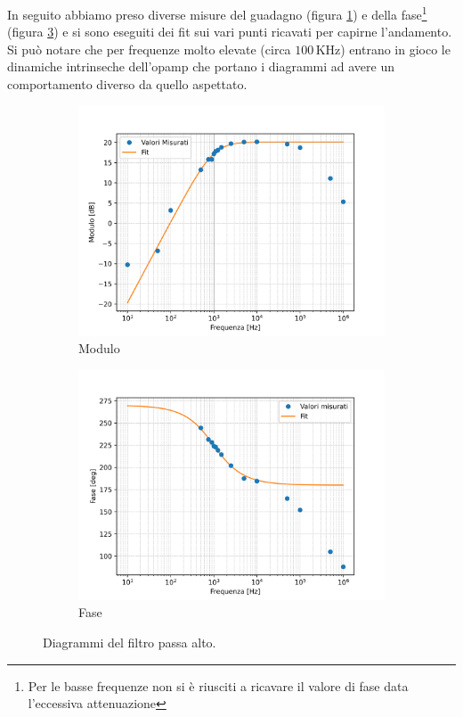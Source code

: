 \documentclass[a4paper,12pt]{article}
\begin{document}
In seguito abbiamo preso diverse misure del guadagno (figura \ref{fig:modulo_filtro_passa_alto}) e della fase\footnote{Per le basse frequenze non si è riusciti a ricavare il valore di fase data l'eccessiva attenuazione} (figura \ref{fig:fase_filtro_passa_alto}) e si sono eseguiti dei fit sui vari punti ricavati per capirne l'andamento. Si può notare che per frequenze molto elevate (circa $100\,\mathrm{KHz}$) entrano in gioco le dinamiche intrinseche dell'opamp che portano i diagrammi ad avere un comportamento diverso da quello aspettato.
\begin{figure}[h]
    \centering
    \begin{subfigure}{0.49 \linewidth}
        \includegraphics[width = 1 \linewidth]{immagini/modulo_filtro_passa_alto.png}
        \caption{Modulo}
        \label{fig:modulo_filtro_passa_alto}
    \end{subfigure}
    \begin{subfigure}{0.49 \linewidth}
        \includegraphics[width = 1 \linewidth]{immagini/fase_filtro_passa_alto.png}
        \caption{Fase}
        \label{fig:fase_filtro_passa_alto}
    \end{subfigure}
    \caption{Diagrammi del filtro passa alto.}
\end{figure}
\end{document}

